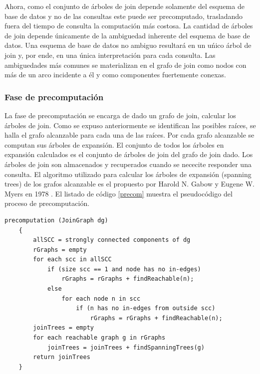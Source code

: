 Ahora, como el conjunto de \'arboles de join depende solamente del esquema de base de datos y no de las consultas
este puede ser precomputado, trasladando fuera del tiempo de consulta la computaci\'on m\'as costosa. La cantidad
de \'arboles de join depende \'unicamente de la ambiguedad inherente del esquema de base de datos. Una esquema 
de base de datos no ambiguo resultar\'a en un u\'nico \'arbol de join y, por ende, en una \'unica interpretaci\'on 
para cada consulta. Las ambiguedades m\'as comunes se materializan en el grafo de join como nodos con m\'as de 
un arco incidente a \'el y como componentes fuertemente conexas.

\subsubsection{Fase de precomputaci\'on}

La fase de precomputaci\'on se encarga de dado un grafo de join, calcular los \'arboles de join. Como se expuso 
anteriormente se identifican las posibles ra\'ices, se halla el grafo alcanzable para cada una de las ra\'ices. 
Por cada grafo alcanzable se computan sus \'arboles de expansi\'on. El conjunto de todos los \'arboles en 
expansi\'on calculados es el conjunto de \'arboles de join del grafo de join dado. Los \'arboles de join 
son almacenados y recuperados cuando se nececite responder una consulta. El algoritmo utilizado para calcular 
los \'arboles de expansi\'on (spanning trees) de los grafos alcanzable es el propuesto por Harold N. Gabow y 
Eugene W. Myers en 1978 \cite{gabow1978finding}. El listado de c\'odigo \ref{precom} muestra el pseudoc\'odigo 
del proceso de precomputaci\'on.

\begin{lstlisting}[label={precom}, caption={Pseudoc\'odigo del proceso de precomputaci\'on}]
    precomputation (JoinGraph dg)
    {
        allSCC = strongly connected components of dg
        rGraphs = empty
        for each scc in allSCC
            if (size scc == 1 and node has no in-edges)
                rGraphs = rGraphs + findReachable(n);
            else
                for each node n in scc
                    if (n has no in-edges from outside scc)
                        rGraphs = rGraphs + findReachable(n);
        joinTrees = empty
        for each reachable graph g in rGraphs
            joinTrees = joinTrees + findSpanningTrees(g)
        return joinTrees
    }
\end{lstlisting}

